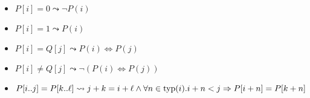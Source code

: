 \begin{itemize}
    \item $P[i] = 0 \leadsto \lnot P(i)$
    \item $P[i] = 1 \leadsto P(i)$
    \item $P[i] = Q[j] \leadsto P(i) \iff P(j)$
    \item $P[i] \neq Q[j] \leadsto \lnot (P(i) \iff P(j))$
    \item $P[i..j] = P[k..\ell] \leadsto j + k = i + \ell \land \forall n \in \text{typ}{\left( {i} \right)}. i + n < j \Rightarrow P[i + n] = P[k + n]$
\end{itemize}






